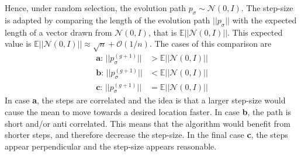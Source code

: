 Hence, under random selection, the evolution path $p_\sigma \sim \mathcal{N} 
\left( 0, I \right)$.  The step-size is adapted by comparing the length
of the evolution path $||p_\sigma||$ with the expected length of a vector 
drawn from $\mathcal{N} \left( 0, I \right)$, that is
$\mathbb{E}||\mathcal{N}\left(0, I\right)||$. This expected value is
$\mathbb{E}||\mathcal{N}\left(0, I\right)|| \approx \sqrt{n} + \mathcal{O}\left(1/n\right)$.
The cases of this comparison are
\begin{align}
\textbf{a: } ||p_\sigma^{(g+1)}|| &> \mathbb{E}||\mathcal{N}\left(0, I\right)|| 
\label{case1}\\
\textbf{b: } ||p_\sigma^{(g+1)}|| &< \mathbb{E}||\mathcal{N}\left(0, I\right)||
\label{case2}\\
\textbf{c: } ||p_\sigma^{(g+1)}|| &= \mathbb{E}||\mathcal{N}\left(0, I\right)||\label{case3}
\end{align}
In case \textbf{a}, the steps are correlated and the idea is that a larger step-size
would cause the mean to move towards a desired location faster. In case \textbf{b},
the path is short and/or anti correlated. This means that the algorithm would benefit from
shorter steps, and therefore decrease the step-size. In the final case \textbf{c}, the 
steps appear perpendicular and the step-size appears reasonable.

